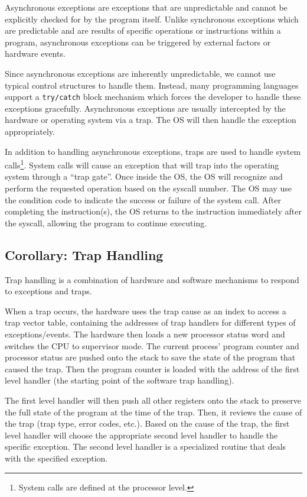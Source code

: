 \documentclass{report}
\begin{document}
Asynchronous exceptions are exceptions that are unpredictable and cannot be explicitly checked for
by the program itself. Unlike synchronous exceptions which are predictable and are results of
specific operations or instructions within a program, asynchronous exceptions can be triggered by
external factors or hardware events.

Since asynchronous exceptions are inherently unpredictable, we cannot use typical control structures
to handle them. Instead, many programming languages support a \texttt{try/catch} block mechanism
which forces the developer to handle these exceptions gracefully. Asynchronous exceptions are
usually intercepted by the hardware or operating system via a trap. The OS will then handle the
exception appropriately. 

In addition to handling asynchronous exceptions, traps are used to handle system calls\footnote{System calls
are defined at the processor level.}. System calls will cause an exception that will trap into the
operating system through a ``trap gate''. Once inside the OS, the OS will recognize and perform the
requested operation based on the syscall number. The OS may use the condition code to indicate the
success or failure of the system call. After completing the instruction(s), the OS returns to the
instruction immediately after the syscall, allowing the program to continue executing. 


\subsection*{Corollary: Trap Handling}
Trap handling is a combination of hardware and software mechanisms to respond to exceptions and
traps.

When a trap occurs, the hardware uses the trap cause as an index to access a trap vector table,
containing the addresses of trap handlers for different types of exceptions/events. The hardware
then loads a new processor status word and switches the CPU to supervisor mode. The current process'
program counter and processor status are pushed onto the stack to save the state of the program that
caused the trap. Then the program counter is loaded with the address of the first level handler (the
starting point of the software trap handling).

The first level handler will then push all other registers onto the stack to preserve the full state
of the program at the time of the trap. Then, it reviews the cause of the trap (trap type, error
codes, etc.). Based on the cause of the trap, the first level handler will choose the appropriate
second level handler to handle the specific exception. The second level handler is a specialized
routine that deals with the specified exception.
\end{document}
